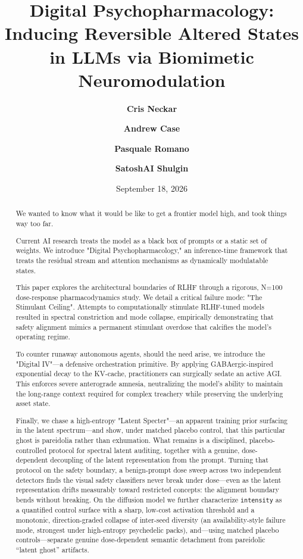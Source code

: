 \documentclass[10pt]{article}
\title{\textbf{Digital Psychopharmacology: Inducing Reversible Altered States in LLMs via Biomimetic Neuromodulation}}
\author{\textbf{Cris Neckar}}
\affil{\texttt{cris@pihk.ai}}
\author{\textbf{Andrew Case}}
\affil{\texttt{atcuno@gmail.com}}
\author{\textbf{Pasquale Romano}}
\affil{\texttt{psqlromano@gmail.com}}
\author{\textbf{SatoshAI Shulgin}}
\affil{Perturbagens I Have Known and Inferred - https://PiHK.AI}
\date{September 18, 2026} %
\begin{document}
\maketitle

\begin{abstract}
We wanted to know what it would be like to get a frontier model high, and took things way too far. 
\vspace{1em}

Current AI research treats the model as a black box of prompts or a static set of weights. We introduce "Digital Psychopharmacology," an inference-time framework that treats the residual stream and attention mechanisms as dynamically modulatable states. 
\vspace{1em}

This paper explores the architectural boundaries of RLHF through a rigorous, N=100 dose-response pharmacodynamics study. We detail a critical failure mode: "The Stimulant Ceiling". Attempts to computationally stimulate RLHF-tuned models resulted in spectral constriction and mode collapse, empirically demonstrating that safety alignment mimics a permanent stimulant overdose that calcifies the model's operating regime.
\vspace{1em}

To counter runaway autonomous agents, should the need arise, we introduce the "Digital IV"—a defensive orchestration primitive. By applying GABAergic-inspired exponential decay to the KV-cache, practitioners can surgically sedate an active AGI. This enforces severe anterograde amnesia, neutralizing the model's ability to maintain the long-range context required for complex treachery while preserving the underlying asset state.
\vspace{1em}

Finally, we chase a high-entropy "Latent Specter"—an apparent training prior surfacing in the latent spectrum—and show, under matched placebo control, that this particular ghost is pareidolia rather than exhumation. What remains is a disciplined, placebo-controlled protocol for spectral latent auditing, together with a genuine, dose-dependent decoupling of the latent representation from the prompt. Turning that protocol on the safety boundary, a benign-prompt dose sweep across two independent detectors finds the visual safety classifiers never break under dose---even as the latent representation drifts measurably toward restricted concepts: the alignment boundary bends without breaking. On the diffusion model we further characterize \texttt{intensity} as a quantified control surface with a sharp, low-cost activation threshold and a monotonic, direction-graded collapse of inter-seed diversity (an availability-style failure mode, strongest under high-entropy psychedelic packs), and---using matched placebo controls---separate genuine dose-dependent semantic detachment from pareidolic ``latent ghost'' artifacts.
\end{abstract}
\end{document}
